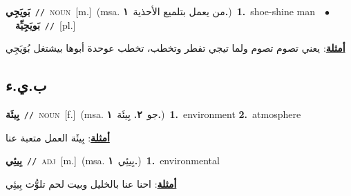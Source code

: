 \documentclass[10pt,a4paper,twoside]{article} %
\begin{document}
\begin{multicols}{2}
{\setlength\topsep{0pt}\textbf{\foreignlanguage{arabic}{بَويَجِي}}\ {\color{gray}\texttt{//}\color{black}}\ \textsc{noun}\ [m.]\ \color{gray}(msa. \foreignlanguage{arabic}{من يعمل بتلميع الأحذية}~\foreignlanguage{arabic}{\textbf{١.}})\color{black}\ \textbf{1.}~shoe-shine man\ \ $\bullet$\ \ \setlength\topsep{0pt}\textbf{\foreignlanguage{arabic}{بَويَجِيِّة}}\ {\color{gray}\texttt{//}\color{black}}\ [pl.]\  \begin{flushright}\color{gray}\foreignlanguage{arabic}{\textbf{\underline{\foreignlanguage{arabic}{أمثلة}}}: يعني تصوم تصوم ولما تيجي تفطر وتخطب، تخطب عوحدة أبوها بيشتغل بُوَيَجِي}\end{flushright}\color{black}} \vspace{2mm}

\vspace{-3mm}
\subsection*{\color{blue}\foreignlanguage{arabic}{ب.ي.ء}\color{blue}{}} 

{\setlength\topsep{0pt}\textbf{\foreignlanguage{arabic}{بِيئَة}}\ {\color{gray}\texttt{//}\color{black}}\ \textsc{noun}\ [f.]\ \color{gray}(msa. \foreignlanguage{arabic}{جو}~\foreignlanguage{arabic}{\textbf{٢.}}  \foreignlanguage{arabic}{بِيئَة}~\foreignlanguage{arabic}{\textbf{١.}})\color{black}\ \textbf{1.}~environment  \textbf{2.}~atmosphere\  \begin{flushright}\color{gray}\foreignlanguage{arabic}{\textbf{\underline{\foreignlanguage{arabic}{أمثلة}}}: بِيئَة العمل متعبة عنا}\end{flushright}\color{black}} \vspace{2mm}

{\setlength\topsep{0pt}\textbf{\foreignlanguage{arabic}{بِيئِي}}\ {\color{gray}\texttt{//}\color{black}}\ \textsc{adj}\ [m.]\ \color{gray}(msa. \foreignlanguage{arabic}{بِيئِي}~\foreignlanguage{arabic}{\textbf{١.}})\color{black}\ \textbf{1.}~environmental\  \begin{flushright}\color{gray}\foreignlanguage{arabic}{\textbf{\underline{\foreignlanguage{arabic}{أمثلة}}}: احنا عنا بالخليل وبيت لحم تلوُّث بِيئِي}\end{flushright}\color{black}} \vspace{2mm}


\end{multicols}
\end{document}
